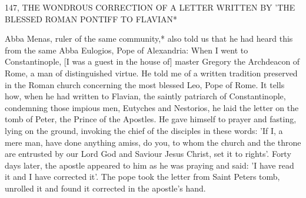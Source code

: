 147, THE WONDROUS CORRECTION
OF A LETTER WRITTEN BY
'THE BLESSED ROMAN PONTIFF TO FLAVIAN*

Abba Menas, ruler of the same community,* also told us that he
had heard this from the same Abba Eulogios, Pope of Alexandria:
When I went to Constantinople, [I was a guest in the house of]
master Gregory the Archdeacon of Rome, a man of distinguished
virtue. He told me of a written tradition preserved in the Roman
church concerning the most blessed Leo, Pope of Rome. It tells
how, when he had written to Flavian, the saintly patriarch of
Constantinople, condemning those impious men, Eutyches and
Nestorios, he laid the letter on the tomb of Peter, the Prince of the
Apostles. He gave himself to prayer and fasting, lying on the
ground, invoking the chief of the disciples in these words: 'If I, a
mere man, have done anything amiss, do you, to whom the church
and the throne are entrusted by our Lord God and Saviour Jesus
Christ, set it to rights'. Forty days later, the apostle appeared to him
as he was praying and said: 'I have read it and I have corrected it'.
The pope took the letter from Saint Peter\textquotesingle s tomb, unrolled it and
found it corrected in the apostle's hand.

